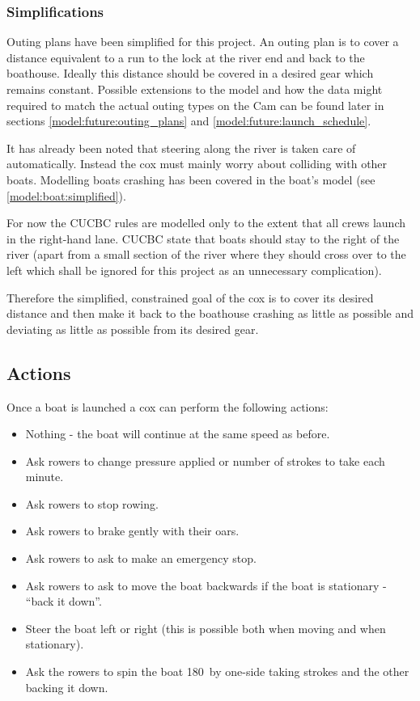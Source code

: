       \subsubsection{Simplifications} \label{model:cox:goals:simplifications}
      Outing plans have been simplified for this project. An outing plan is to cover a distance equivalent to a run to the lock at the river end and back to the boathouse. Ideally this distance should be covered in a desired gear which remains constant. Possible extensions to the model and how the data might required to match the actual outing types on the Cam can be found later in sections \ref{model:future:outing_plans} and \ref{model:future:launch_schedule}.
      
      It has already been noted that steering along the river is taken care of automatically. Instead the cox must mainly worry about colliding with other boats. Modelling boats crashing has been covered in the boat's model (see \ref{model:boat:simplified}). 
      
      For now the CUCBC rules are modelled only to the extent that all crews launch in the right-hand lane. CUCBC state that boats should stay to the right of the river (apart from a small section of the river where they should cross over to the left which shall be ignored for this project as an unnecessary complication).
      
      Therefore the simplified, constrained goal of the cox is to cover its desired distance and then make it back to the boathouse crashing as little as possible and deviating as little as possible from its desired gear.

      \subsection{Actions} \label{model:cox:actions}
      Once a boat is launched a cox can perform the following actions:
      \begin{itemize}
        \item Nothing - the boat will continue at the same speed as before.
        \item Ask rowers to change pressure applied or number of
          strokes to take each minute.
        \item Ask rowers to stop rowing.
        \item Ask rowers to brake gently with their oars.
        \item Ask rowers to ask to make an emergency stop.
        \item Ask rowers to ask to move the boat backwards if the boat
          is stationary - ``back it down''.
        \item Steer the boat left or right (this is possible both when moving and when stationary).
        \item Ask the rowers to spin the boat 180\textdegree\ by
          one-side taking strokes and the other backing it down.
      \end{itemize}
      
